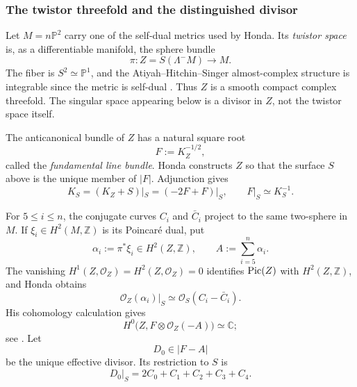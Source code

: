 \documentclass[11pt]{amsart}
\numberwithin{equation}{section}
\def\mc{\mathcal}
\def\mb{\mathbb}
\def\Pic{{\rm Pic}}
\theoremstyle{plain}
\theoremstyle{definition}
\begin{document}
\subsubsection{The twistor threefold and the distinguished divisor}

Let $M=n\mathbb P^2$ carry one of the self-dual metrics used by Honda.  Its
\emph{twistor space} is, as a differentiable manifold, the sphere bundle
\begin{equation*}%
 \pi:Z=S(\Lambda^-M)\longrightarrow M.
\end{equation*}
The fiber is $S^2\simeq\mathbb P^1$, and the
Atiyah--Hitchin--Singer almost-complex
structure is integrable since the metric is self-dual
\cite[pp.~425--431]{AHS78}.  Thus $Z$ is a smooth compact complex threefold.
The singular space appearing below is a divisor in $Z$, not the twistor space
itself.

The anticanonical bundle of $Z$ has a natural square root
\begin{equation*}%
 F:=K_Z^{-1/2},
\end{equation*}
called the \emph{fundamental line bundle}.  Honda constructs $Z$ so that the
surface $S$ above is the unique member of $|F|$.  Adjunction gives
\begin{equation*}%
 K_S=(K_Z+S)|_S=(-2F+F)|_S,\qquad F|_S\simeq K_S^{-1}.
\end{equation*}

For $5\leq i\leq n$, the conjugate curves $C_i$ and $\bar C_i$ project to the
same two-sphere in $M$.  If $\xi_i\in H^2(M,\mb Z)$ is its Poincar\'e dual,
put
\begin{equation*}%
 \alpha_i:=\pi^*\xi_i\in H^2(Z,\mb Z),\qquad
 A:=\sum_{i=5}^{n}\alpha_i.
\end{equation*}
The vanishing $H^1(Z,\mc O_Z)=H^2(Z,\mc O_Z)=0$ identifies
$\Pic(Z)$ with $H^2(Z,\mb Z)$, and Honda obtains
\begin{equation*}%
 \mc O_Z(\alpha_i)|_S\simeq\mc O_S(C_i-\bar C_i).
\end{equation*}
His cohomology calculation gives
\begin{equation*}%
 H^0\bigl(Z,F\otimes\mc O_Z(-A)\bigr)\simeq\mb C;
\end{equation*}
see \cite[Proposition 3.6 and equations (3.18)--(3.30)]{Hn15}.  Let
\begin{equation*}%
 D_0\in|F-A|
\end{equation*}
be the unique effective divisor.  Its restriction to $S$ is
\begin{equation}\label{D0-restriction}
 D_0|_S=2C_0+C_1+C_2+C_3+C_4.
\end{equation}
\end{document}
